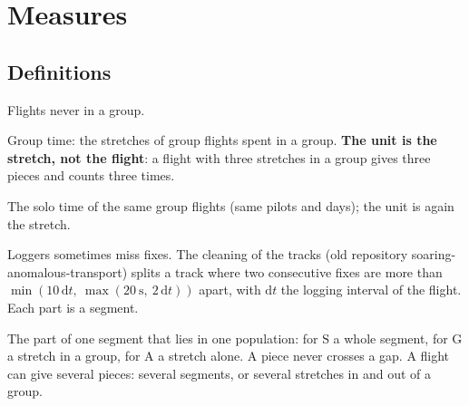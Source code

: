 \documentclass[10pt,a4paper]{article}
\newcommand{\G}{\mathrm{G}}
\newcommand{\A}{\mathrm{A}}
\newcommand{\Sl}{\mathrm{S}}
\begin{document}
\section{Measures}\label{measures}

\subsection{Definitions}\label{definitions}

\begin{description}[leftmargin=0pt, itemsep=7pt]
\item[S] Flights never in a group.
\item[G] Group time: the stretches of group flights spent in a group. \textbf{The unit is the stretch,
  not the flight}: a flight with three stretches in a group gives three pieces and counts three times.
\item[A] The solo time of the same group flights (same pilots and days); the unit is again the stretch.
\item[Segment] Loggers sometimes miss fixes. The cleaning of the tracks (old repository soaring-anomalous-transport) splits a track
  where two consecutive fixes are more than $\min(10\,\mathrm{d}t,\ \max(20~\mathrm{s},\ 2\,\mathrm{d}t))$
  apart, with $\mathrm{d}t$ the logging interval of the flight. Each part is a segment.
\item[Piece] The part of one segment that lies in one population: for $\Sl$ a whole segment, for $\G$ a
  stretch in a group, for $\A$ a stretch alone. A piece never crosses a gap. A flight can give several
  pieces: several segments, or several stretches in and out of a group.


\end{description}
\end{document}
